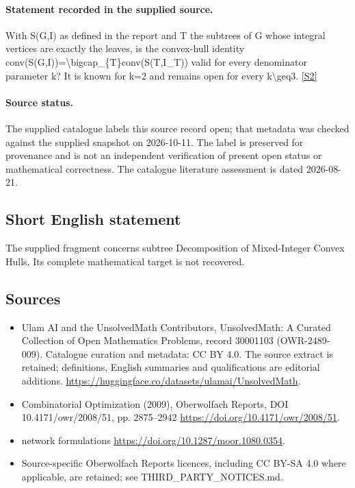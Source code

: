 \documentclass[11pt]{article}
\newcommand{\sref}[2]{\hyperlink{source:#1:#2}{[S#2]}}
\begin{document}
\paragraph{Statement recorded in the supplied source.}
With S(G,I) as defined in the report and T the subtrees of G whose integral vertices are exactly the leaves, is the convex-hull identity conv(S(G,I))=\textbackslash{}bigcap\_\{T\}conv(S(T,I\_T)) valid for every denominator parameter k? It is known for k=2 and remains open for every k\textbackslash{}geq3. \sref{30001103}{2}
\paragraph{Source status.}
The supplied catalogue labels this source record open; that metadata was checked against the supplied snapshot on 2026-10-11. The label is preserved for provenance and is not an independent verification of present open status or mathematical correctness. The catalogue literature assessment is dated 2026-08-21.
\subsection{Short English statement}
The supplied fragment concerns subtree Decomposition of Mixed-Integer Convex Hulls. Its complete mathematical target is not recovered.
\subsection{Sources}
\begin{itemize}
\item[\hypertarget{source:30001103:1}{S1}] Ulam AI and the UnsolvedMath Contributors, UnsolvedMath: A Curated Collection of Open Mathematics Problems, record 30001103 (OWR-2489-009). Catalogue curation and metadata: CC BY 4.0. The source extract is retained; definitions, English summaries and qualifications are editorial additions.
\url{https://huggingface.co/datasets/ulamai/UnsolvedMath}.
\item[\hypertarget{source:30001103:2}{S2}] Combinatorial Optimization (2009), Oberwolfach Reports, DOI 10.4171/owr/2008/51, pp. 2875--2942
\url{https://doi.org/10.4171/owr/2008/51}.
\item[\hypertarget{source:30001103:3}{S3}] network formulations
\url{https://doi.org/10.1287/moor.1080.0354}.
\item Source-specific Oberwolfach Reports licences, including CC BY-SA 4.0 where applicable, are retained; see THIRD\_PARTY\_NOTICES.md.
\end{itemize}
\end{document}
